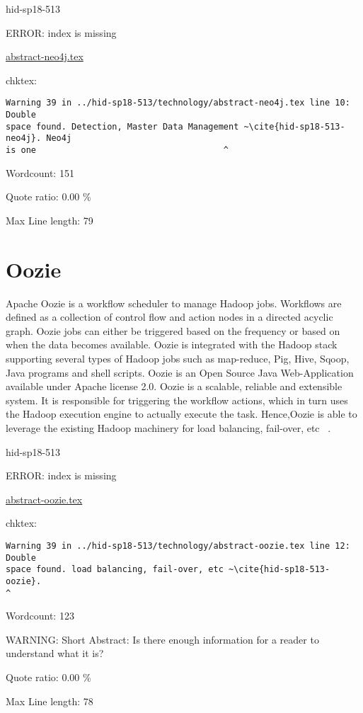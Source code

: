 \begin{IU}

hid-sp18-513

ERROR: index is missing

\href{https://github.com/cloudmesh-community/hid-sp18-513/blob/master//technology/abstract-neo4j.tex}{abstract-neo4j.tex}

 
chktex:
\begin{tiny}
\begin{verbatim}
Warning 39 in ../hid-sp18-513/technology/abstract-neo4j.tex line 10: Double
space found. Detection, Master Data Management ~\cite{hid-sp18-513-neo4j}. Neo4j
is one                                     ^
\end{verbatim}
\end{tiny}

Wordcount: 151


Quote ratio: 0.00 \%
 
Max Line length: 79
\end{IU}

\section{Oozie}
Apache Oozie is a workflow scheduler to manage Hadoop jobs. Workflows are 
defined as a collection of control flow and action nodes in a directed 
acyclic graph. Oozie jobs can either be triggered based on the frequency 
or based on when the data becomes available. Oozie is integrated with the 
Hadoop stack supporting several types of Hadoop jobs such as map-reduce, Pig,
Hive, Sqoop, Java programs and shell scripts. Oozie is an Open Source Java 
Web-Application available under Apache license 2.0. Oozie is a scalable, 
reliable and extensible system. It is responsible for triggering the workflow 
actions, which in turn uses the Hadoop execution engine to actually execute 
the task. Hence,Oozie is able to leverage the existing Hadoop machinery for
load balancing, fail-over, etc ~\cite{hid-sp18-513-oozie}.


\begin{IU}

hid-sp18-513

ERROR: index is missing

\href{https://github.com/cloudmesh-community/hid-sp18-513/blob/master//technology/abstract-oozie.tex}{abstract-oozie.tex}

 
chktex:
\begin{tiny}
\begin{verbatim}
Warning 39 in ../hid-sp18-513/technology/abstract-oozie.tex line 12: Double
space found. load balancing, fail-over, etc ~\cite{hid-sp18-513-oozie}.
^
\end{verbatim}
\end{tiny}

Wordcount: 123

WARNING: Short Abstract: Is there enough information for a reader to understand what it is?


Quote ratio: 0.00 \%
 
Max Line length: 78
\end{IU}

